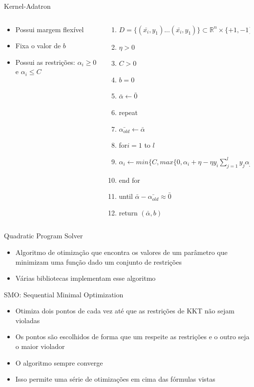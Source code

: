 \documentclass{beamer}
\begin{document}
\begin{frame}{Kernel-Adatron}
\begin{columns}
\begin{column}{0.39\textwidth}
    \begin{itemize}
        \item Possui margem flexível
        \item Fixa o valor de $b$
        \item Possui as restrições: $\alpha_i \ge 0$ e $\alpha_i \le C$
    \end{itemize}
\end{column}
\begin{column}{0.59\textwidth}
\begin{enumerate}
    \item $D = \{(\bar{x_i},y_1)...(\bar{x_i},y_1)\} \subset \mathbb{R}^{n}\times \{+1,-1\}$
    \item $\eta>0$
    \item $C>0$
    \item $b=0$
    \item $\bar{\alpha} \leftarrow \bar{0}$
    \item repeat
    \item $\bar{\alpha_{old}} \leftarrow \bar{\alpha}$
    \item for$i=1$ to $l$
    \item $\alpha_i \leftarrow min\big\{C,max\big\{0,\alpha_i + \eta-\eta y_i \sum_{j=1}^l y_j \alpha_j k(\bar{x}_j,\bar{x}_i))\big\}\big\}$
    \item end for
    \item until $\bar{\alpha}-\bar{\alpha_{old}}\approx \bar{0}$
    \item return $(\bar{\alpha},b)$
\end{enumerate}
\end{column}
\end{columns}
\end{frame}

\begin{frame}{Quadratic Program Solver}
\begin{itemize}
    \item Algoritmo de otimização que encontra os valores de um parâmetro que minimizam uma função dado um conjunto de restrições
    \item Várias bibliotecas implementam esse algoritmo
\end{itemize}
\end{frame}

\begin{frame}{SMO: Sequential Minimal Optimization}
\begin{itemize}
    \item Otimiza dois pontos de cada vez até que as restrições de KKT não sejam violadas
    \item Os pontos são escolhidos de forma que um respeite as restrições e o outro seja o maior violador
    \item O algoritmo sempre converge
    \item Isso permite uma série de otimizações em cima das fórmulas vistas
\end{itemize}
\end{frame}
\end{document}
